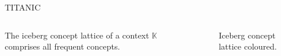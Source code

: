 \begin{frame}{TITANIC~\cite{titanic_2002}}
\begin{columns}
    \begin{column}{0.7\textwidth}
        \begin{definition}
        The iceberg concept lattice of a context $\mathbb{K}$ comprises all frequent concepts.
        \end{definition}

    \end{column}
    \begin{column}{0.25\textwidth}
    \begin{figure}[htbp]
        \centering
        \resizebox{\textwidth}{!}{\FormalConceptGraphColoured}
        \caption{Iceberg concept lattice coloured.}
        \label{fig:titanic_formal_concept_graph_coloured}
    \end{figure}
    \end{column}
\end{columns}
\end{frame}